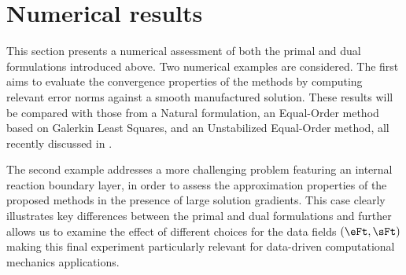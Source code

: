 
\section{Numerical results}

This section presents a numerical assessment of both the primal and dual formulations introduced above. Two numerical examples are considered. The first aims to evaluate the convergence properties of the methods by computing relevant error norms against a smooth manufactured solution. These results will be compared with those from a Natural formulation, an Equal-Order method based on Galerkin Least Squares, and an Unstabilized Equal-Order method, all recently discussed in \cite{ddcm1_article_gus}.

The second example addresses a more challenging problem featuring an internal reaction boundary layer, in order to assess the approximation properties of the proposed methods in the presence of large solution gradients. This case clearly illustrates key differences between the primal and dual formulations and further allows us to examine the effect of different choices for the data fields $(\eFt,\sFt)$ making this final experiment particularly relevant for data-driven computational mechanics applications.

